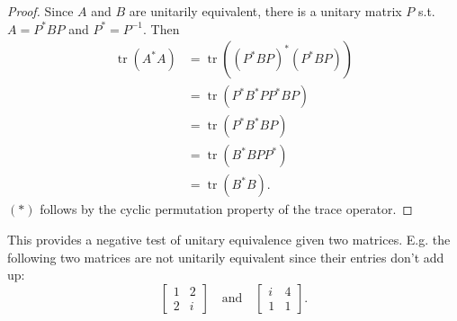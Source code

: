 \documentclass[12pt]{article}
\theoremstyle{plain}
\theoremstyle{definition}
\theoremstyle{remark}
\DeclareMathOperator{\tr}{tr}
\newcommand{\0}{\varnothing}
\newcommand{\<}{\langle}
\renewcommand{\>}{\rangle}
\begin{document}
\begin{proof}
Since $ A $ and $ B $ are unitarily equivalent, there is a unitary matrix $ P $ s.t. $ A = P^* B P $ and $ P^* = P^{-1}. $ Then \begin{align*}
\tr(A^* A) &= \tr((P^* B P)^* (P^* B P)) \\
&= \tr(P^* B^* P P^* B P) \\
&= \tr(P^* B^* B P) \\
&= \tr(B^* B P P^*) \tag{$ * $} \\
&= \tr(B^* B).
\end{align*}
$ (*) $ follows by the cyclic permutation property of the trace operator.
\end{proof}

This provides a negative test of unitary equivalence given two matrices. E.g. the following two matrices are not unitarily equivalent since their entries don't add up: \[
\left[ \begin{array}{cc}
1 & 2 \\
2 & i
\end{array} \right]
\quad\text{and}\quad
\left[ \begin{array}{cc}
i & 4 \\
1 & 1
\end{array} \right].
\]
\end{document}
